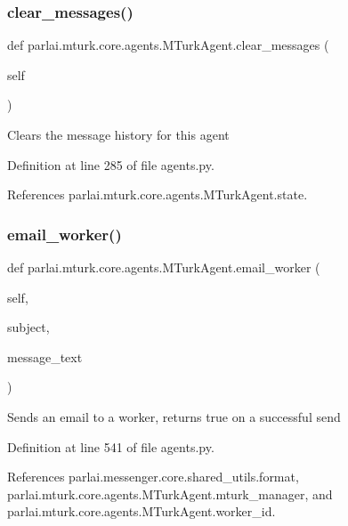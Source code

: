\subsubsection{\texorpdfstring{clear\+\_\+messages()}{clear\_messages()}}
{\footnotesize\ttfamily def parlai.\+mturk.\+core.\+agents.\+M\+Turk\+Agent.\+clear\+\_\+messages (\begin{DoxyParamCaption}\item[{}]{self }\end{DoxyParamCaption})}

\begin{DoxyVerb}Clears the message history for this agent\end{DoxyVerb}
 

Definition at line 285 of file agents.\+py.



References parlai.\+mturk.\+core.\+agents.\+M\+Turk\+Agent.\+state.

\mbox{\label{classparlai_1_1mturk_1_1core_1_1agents_1_1MTurkAgent_a5bd91f1939122df606623b61c0467976}} 
\subsubsection{\texorpdfstring{email\+\_\+worker()}{email\_worker()}}
{\footnotesize\ttfamily def parlai.\+mturk.\+core.\+agents.\+M\+Turk\+Agent.\+email\+\_\+worker (\begin{DoxyParamCaption}\item[{}]{self,  }\item[{}]{subject,  }\item[{}]{message\+\_\+text }\end{DoxyParamCaption})}

\begin{DoxyVerb}Sends an email to a worker, returns true on a successful send\end{DoxyVerb}
 

Definition at line 541 of file agents.\+py.



References parlai.\+messenger.\+core.\+shared\+\_\+utils.\+format, parlai.\+mturk.\+core.\+agents.\+M\+Turk\+Agent.\+mturk\+\_\+manager, and parlai.\+mturk.\+core.\+agents.\+M\+Turk\+Agent.\+worker\+\_\+id.

